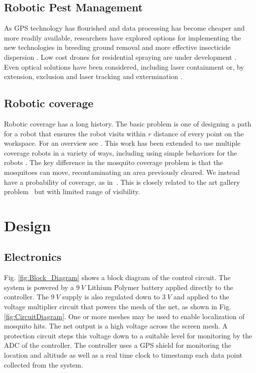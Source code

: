 \documentclass[letterpaper, 10 pt, conference]{ieeeconf}  %
\begin{document}
    \subsection{Robotic Pest Management}
    
As GPS technology has flourished and data processing has become cheaper and more readily available, researchers have explored options for implementing the new technologies in breeding ground removal \cite{anupa2014identification} and more effective insecticide dispersion \cite{hur2015low}.  Low cost drones for residential spraying are under development \cite{amenyo2014medizdroids}.  Even optical solutions have been considered, including laser containment \cite{boonsri2012laser} or, by extension, exclusion and laser tracking and extermination \cite{kare2010build}.
    
    \subsection{Robotic coverage}
    Robotic coverage has a long history. The basic problem is one of designing a path for a robot that ensures the robot visits within $r$ distance of every point on the workspace.  For an overview see \cite{Choset2001}.  This work has been extended to use multiple coverage robots in a variety of ways, including using simple behaviors for the robots \cite{spears2006physics,Koenig2001}.
    The key difference in the mosquito coverage problem is that the mosquitoes can move, recontaminating an area previously cleared. We instead have a probability of coverage, as in~\cite{Das2011}.  This is closely related to the art gallery problem~\cite{lee1986computational} but with limited range of visibility.
    
  \section{Design}
  
   \subsection{Electronics}
   
Fig. \ref{fig:Block_Diagram} shows a block diagram of the control circuit.  The system is powered by a $9~V$ Lithium Polymer battery applied directly to the controller. The $9~V$ supply is also regulated down to $3~V$ and applied to the voltage multiplier circuit that powers the mesh of the net, as shown in Fig. \ref{fig:CircuitDiagram}. One or more meshes may be used to enable localization of mosquito hits. The net output is a high voltage across the screen mesh.   A protection circuit steps this voltage down to a suitable level for monitoring by the ADC of the controller. The controller uses a GPS shield for monitoring the location and altitude as well as a real time clock to timestamp each data point collected from the system.     
\end{document}
